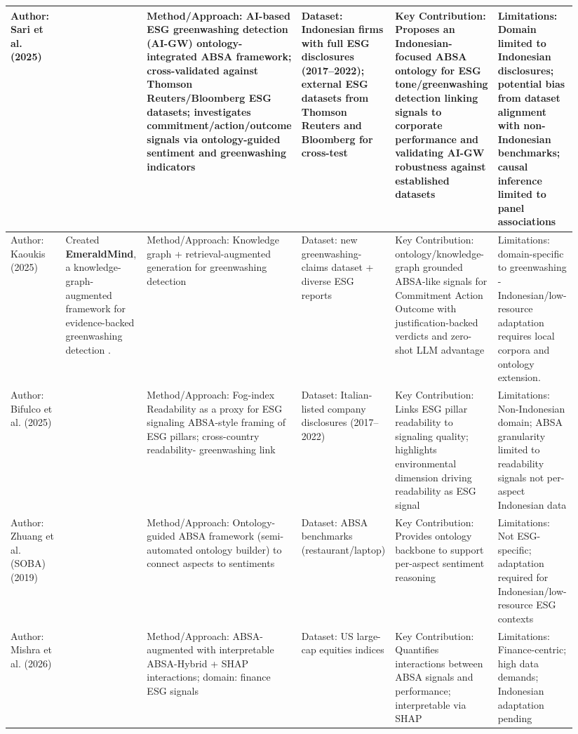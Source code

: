 \documentclass{article}
\begin{document}
\begin{landscape}
\begin{longtable}{p{0.157\linewidth} p{0.157\linewidth} p{0.157\linewidth} p{0.157\linewidth} p{0.157\linewidth} p{0.157\linewidth}}
Author: Sari et al. (2025) & ~ & Method/Approach: AI-based ESG greenwashing detection (AI-GW) ontology-integrated ABSA framework; cross-validated against Thomson Reuters/Bloomberg ESG datasets; investigates commitment/action/outcome signals via ontology-guided sentiment and greenwashing indicators & Dataset: Indonesian firms with full ESG disclosures (2017–2022); external ESG datasets from Thomson Reuters and Bloomberg for cross-test & Key Contribution: Proposes an Indonesian-focused ABSA ontology for ESG tone/greenwashing detection linking signals to corporate performance and validating AI-GW robustness against established datasets & Limitations: Domain limited to Indonesian disclosures; potential bias from dataset alignment with non-Indonesian benchmarks; causal inference limited to panel associations \\ \hline
Author: Kaoukis (2025) & Created \textbf{EmeraldMind}, a knowledge-graph-augmented framework for evidence-backed greenwashing detection  \parencite{kaoukis__georgios_35bab107}. & Method/Approach: Knowledge graph + retrieval-augmented generation for greenwashing detection & Dataset: new greenwashing-claims dataset + diverse ESG reports & Key Contribution: ontology/knowledge-graph grounded ABSA-like signals for Commitment Action Outcome with justification-backed verdicts and zero-shot LLM advantage & Limitations: domain-specific to greenwashing - Indonesian/low-resource adaptation requires local corpora and ontology extension. \\ \hline
Author: Bifulco et al. (2025) & ~ & Method/Approach: Fog-index Readability as a proxy for ESG signaling ABSA-style framing of ESG pillars; cross-country readability- greenwashing link & Dataset: Italian-listed company disclosures (2017–2022) & Key Contribution: Links ESG pillar readability to signaling quality; highlights environmental dimension driving readability as ESG signal & Limitations: Non-Indonesian domain; ABSA granularity limited to readability signals not per-aspect Indonesian data \\ \hline
Author: Zhuang et al. (SOBA) (2019) & ~ & Method/Approach: Ontology-guided ABSA framework (semi-automated ontology builder) to connect aspects to sentiments & Dataset: ABSA benchmarks (restaurant/laptop) & Key Contribution: Provides ontology backbone to support per-aspect sentiment reasoning & Limitations: Not ESG-specific; adaptation required for Indonesian/low-resource ESG contexts \\ \hline
Author: Mishra et al. (2026) & ~ & Method/Approach: ABSA-augmented with interpretable ABSA-Hybrid + SHAP interactions; domain: finance ESG signals & Dataset: US large-cap equities indices & Key Contribution: Quantifies interactions between ABSA signals and performance; interpretable via SHAP & Limitations: Finance-centric; high data demands; Indonesian adaptation pending \\ \hline

\end{longtable}
\end{landscape}
\end{document}
